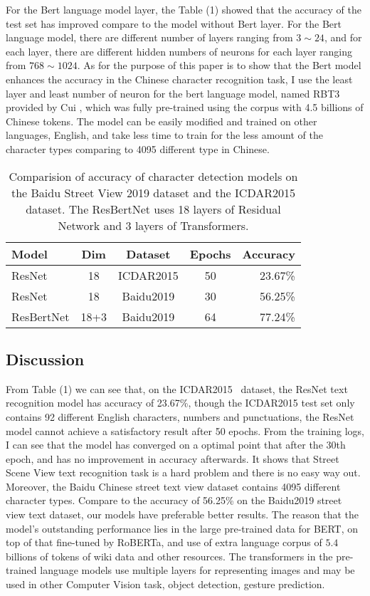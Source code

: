 \documentclass[review]{cvpr}
\begin{document}
For the Bert language model layer, the Table (1) showed that the accuracy of the test set has improved compare to the model without Bert layer.
For the Bert language model, there are different number of layers ranging from $3\sim24$, and for each layer,
there are different hidden numbers of neurons for each layer ranging from $768\sim1024$.
As for the purpose of this paper is to show that the Bert model enhances the accuracy in the Chinese character recognition task,
I use the least layer and least number of neuron for the bert language model, named RBT3 provided by Cui \etal,
which was fully pre-trained using the corpus with 4.5 billions of Chinese tokens.
The model can be easily modified and trained on other languages, \eg English,
and take less time to train for the less amount of the character types comparing to
4095 different type in Chinese.


\begin{table}
\begin{center}
\begin{tabular}{|l|c|c|c|r|}
\hline
Model & Dim & Dataset& Epochs & Accuracy \\
\hline\hline
ResNet      & 18 &  ICDAR2015     & 50 &	23.67\% \\
ResNet      & 18 &  Baidu2019	  & 30 &	56.25\% \\
ResBertNet  & 18+3 & Baidu2019    & 64	&	77.24\% \\
\hline
\end{tabular}
\end{center}
\caption{Comparision of accuracy of character detection models on the Baidu Street View 2019 dataset and the ICDAR2015 dataset.
The ResBertNet uses 18 layers of Residual Network and 3 layers of Transformers.}
\end{table}


\subsection{Discussion}

From Table (1) we can see that, on the ICDAR2015~\cite{karatzas2015icdar} dataset, the ResNet text recognition model has accuracy of 23.67\%,
though the ICDAR2015 test set only contains 92 different English characters, numbers and punctuations,
the ResNet model cannot achieve a satisfactory result after 50 epochs.
From the training logs, I can see that the model has converged on a optimal point that after the 30th epoch,
and has no improvement in accuracy afterwards.
It shows that Street Scene View text recognition task is a hard problem and there is no easy way out.
Moreover, the Baidu Chinese street text view dataset contains 4095 different character types.
Compare to the accuracy of 56.25\% on the Baidu2019 street view text dataset, our models have preferable better results.
The reason that the model's outstanding performance lies in the large pre-trained data for BERT, on top of that fine-tuned by RoBERTa, and use of extra language corpus of
$5.4$ billions of tokens of wiki data and other resources.
The transformers in the pre-trained language models use multiple layers for representing images and may be used in other Computer Vision task, \eg object detection, gesture prediction.
\end{document}
